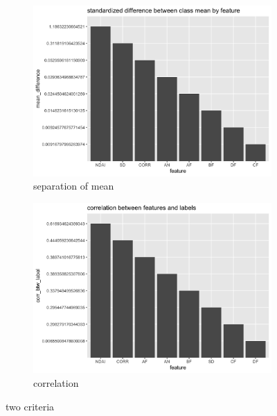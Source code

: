 \documentclass[jou]{apa}%
\begin{document}
\begin{figure}[H]
\hspace*{-.5cm}\begin{subfigure}{0.4\columnwidth}
    \includegraphics[scale=.1]{mean}
    \caption{separation of mean}
    \label{fig:1}
  \end{subfigure}\hfill %
\begin{subfigure}{0.4\columnwidth} \hspace*{-1cm}
    \includegraphics[scale=.1]{correlation}
    \caption{correlation}
    \label{fig:2}
  \end{subfigure}
 \caption{two criteria}
\end{figure}
\end{document}
